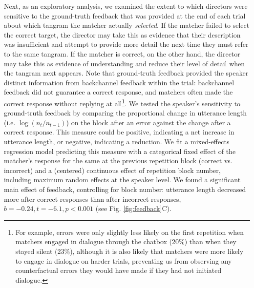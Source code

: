 \documentclass[alpha-refs]{wiley-article}
\begin{document}
Next, as an exploratory analysis, we examined the extent to which directors were sensitive to the ground-truth feedback that was provided at the end of each trial about which tangram the matcher actually \emph{selected}.
If the matcher failed to select the correct target, the director may take this as evidence that their description was insufficient and attempt to provide more detail the next time they must refer to the same tangram.
If the matcher is correct, on the other hand, the director may take this as evidence of understanding and reduce their level of detail when the tangram next appears.
Note that ground-truth feedback provided the speaker distinct information from backchannel feedback within the trial: backchannel feedback did not guarantee a correct response, and matchers often made the correct response without replying at all\footnote{For example, errors were only slightly less likely on the first repetition when matchers engaged in dialogue through the chatbox (20\%) than when they stayed silent (23\%), although it is also likely that matchers were more likely to engage in dialogue on harder trials, preventing us from observing any counterfactual errors they would have made if they had not initiated dialogue.}.
We tested the speaker's sensitivity to ground-truth feedback by comparing the proportional change in utterance length (i.e. $\log(n_{t}/n_{t-1})$) on the block after an error against the change after a correct response.
This measure could be positive, indicating a net increase in utterance length, or negative, indicating a reduction.
We fit a mixed-effects regression model predicting this measure with a categorical fixed effect of the matcher's response for the same at the previous repetition block (correct vs. incorrect) and a (centered) continuous effect of repetition block number, including maximum random effects at the speaker level.
We found a significant main effect of feedback, controlling for block number: utterance length decreased more after correct responses than after incorrect responses, $b = -0.24, t = -6.1, p < 0.001$ (see Fig. \ref{fig:feedback}C).
\end{document}

